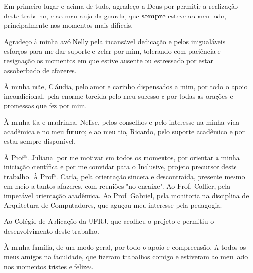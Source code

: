 Em primeiro lugar e acima de tudo, agradeço a Deus por permitir a realização deste trabalho, e ao meu anjo da guarda, que \textbf{sempre} esteve ao meu lado, principalmente nos momentos mais difíceis.

Agradeço à minha avó Nelly pela incansável dedicação e pelos inigualáveis esforços para me dar suporte e zelar por mim, tolerando com paciência e resignação os momentos em que estive ausente ou estressado por estar assoberbado de afazeres.

À minha mãe, Cláudia, pelo amor e carinho dispensados a mim, por todo o apoio incondicional, pela enorme torcida pelo meu sucesso e por todas as orações e promessas que fez por mim.

À minha tia e madrinha, Nelise, pelos conselhos e pelo interesse na minha vida acadêmica e no meu futuro; e ao meu tio, Ricardo, pelo suporte acadêmico e por estar sempre disponível.

À Profª. Juliana, por me motivar em todos os momentos, por orientar a minha iniciação científica e por me convidar para o Inclusive, projeto precursor deste trabalho. À Profª. Carla, pela orientação sincera e descontraída, presente mesmo em meio a tantos afazeres, com reuniões "no encaixe". Ao Prof. Collier, pela impecável orientação acadêmica. Ao Prof. Gabriel, pela monitoria na disciplina de Arquitetura de Computadores, que aguçou meu interesse pela pedagogia.

Ao Colégio de Aplicação da UFRJ, que acolheu o projeto e permitiu o desenvolvimento deste trabalho.

À minha família, de um modo geral, por todo o apoio e compreensão. A todos os meus amigos na faculdade, que fizeram trabalhos comigo e estiveram ao meu lado nos momentos tristes e felizes.